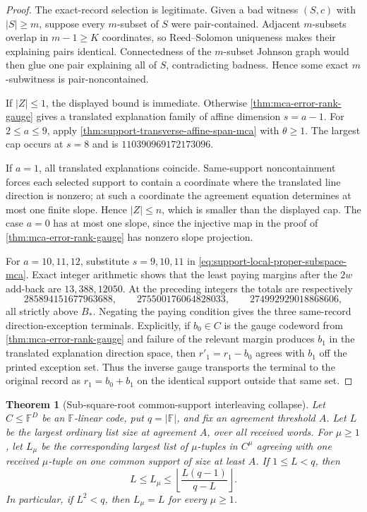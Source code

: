\documentclass[11pt,a4paper]{amsart}
\numberwithin{equation}{section}
\newtheorem{theorem}{Theorem}[section]
\theoremstyle{remark}
\newcommand{\F}{\mathbb F}\newcommand{\B}{\mathbb B}\newcommand{\K}{\mathbb K}\newcommand{\Z}{\mathbb Z}
\begin{document}
\begin{proof}
The exact-record selection is legitimate.  Given a bad witness
\((S,c)\) with \(|S|\ge m\), suppose every \(m\)-subset of \(S\) were
pair-contained.  Adjacent \(m\)-subsets overlap in
\(m-1\ge K\) coordinates, so Reed--Solomon uniqueness makes their
explaining pairs identical.  Connectedness of the \(m\)-subset Johnson
graph would then glue one pair explaining all of \(S\), contradicting
badness.  Hence some exact \(m\)-subwitness is pair-noncontained.

If \(|Z|\le1\), the displayed bound is immediate.  Otherwise
\cref{thm:mca-error-rank-gauge} gives a translated explanation family of
affine dimension \(s=a-1\).  For \(2\le a\le9\), apply
\cref{thm:support-transverse-affine-span-mca} with \(\theta\ge1\).  The
largest cap occurs at \(s=8\) and is \(110390969172173096\).

If \(a=1\), all translated explanations coincide.  Same-support
noncontainment forces each selected support to contain a coordinate where
the translated line direction is nonzero; at such a coordinate the
agreement equation determines at most one finite slope.  Hence \(|Z|\le n\),
which is smaller than the displayed cap.  The case \(a=0\) has at most one
slope, since the injective map in the proof of
\cref{thm:mca-error-rank-gauge} has nonzero slope projection.

For \(a=10,11,12\), substitute \(s=9,10,11\) in
\eqref{eq:support-local-proper-subspace-mca}.  Exact integer arithmetic
shows that the least paying margins after the \(2w\) add-back are
\(13,388,12050\).  At the preceding integers the totals are respectively
\[
 285894151677963688,\qquad
 275500176064828033,\qquad
 274992929018868606,
\]
all strictly above \(B_*\).  Negating the paying condition gives the three
same-record direction-exception terminals.  Explicitly, if $b_0\in C$
is the gauge codeword from \cref{thm:mca-error-rank-gauge} and failure of
the relevant margin produces $b_1$ in the translated explanation
direction space, then $r'_1=r_1-b_0$ agrees with $b_1$ off the printed
exception set.  Thus the inverse gauge transports the terminal to the
original record as $r_1=b_0+b_1$ on the identical support outside that
same set.
\end{proof}


\begin{theorem}[Sub-square-root common-support interleaving collapse]
\label{thm:subsquare-interleaving-collapse}
Let \(C\leq\F^D\) be an \(\F\)-linear code, put \(q=|\F|\), and fix an
agreement threshold \(A\).  Let \(L\) be the largest ordinary list size
at agreement \(A\), over all received words.  For \(\mu\geq1\), let
\(L_\mu\) be the corresponding largest list of \(\mu\)-tuples in
\(C^\mu\) agreeing with one received \(\mu\)-tuple on one common support
of size at least \(A\).  If \(1\leq L<q\), then
\[
 L\leq L_\mu\leq
 \left\lfloor\frac{L(q-1)}{q-L}\right\rfloor .
\]
In particular, if \(L^2<q\), then \(L_\mu=L\) for every \(\mu\geq1\).
\end{theorem}
\end{document}
